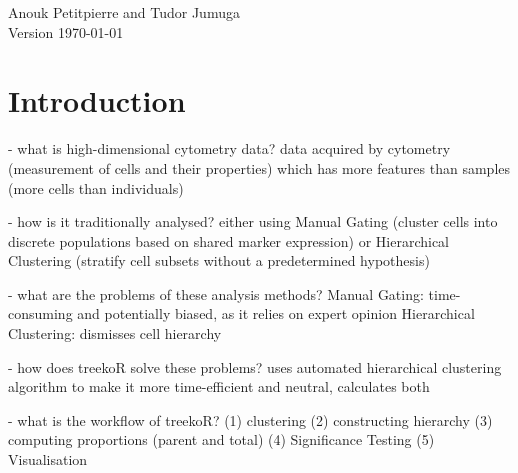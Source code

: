 \documentclass[11pt,a4paper,twoside]{report}\usepackage[]{graphicx}\usepackage[]{color}
\begin{document}
\graphicspath{{./figure/}}            %
\setcounter{tocdepth}{1}              %

\thispagestyle{empty}                 %
\begin{center}
  \vspace*{6cm}{\bfseries\Huge  %
  STA426 treekoR project\\[5mm]
  }
  \vfill

  \LARGE         Anouk Petitpierre and Tudor Jumuga\\[12mm]  %
  
  \normalsize    Version \today            %
\end{center}
\cleardoublepage

\thispagestyle{plain}
\tableofcontents
\cleardoublepage





\chapter{Introduction}

- what is high-dimensional cytometry data?
data acquired by cytometry (measurement of cells and their properties) which has more features than samples (more cells than individuals)

- how is it traditionally analysed?
either using Manual Gating (cluster cells into discrete populations based on shared marker expression) or Hierarchical Clustering (stratify cell subsets without a predetermined hypothesis)

- what are the problems of these analysis methods?
Manual Gating: time-consuming and potentially biased, as it relies on expert opinion
Hierarchical Clustering: dismisses cell hierarchy

- how does treekoR solve these problems?
uses automated hierarchical clustering algorithm to make it more time-efficient and neutral, calculates both %

- what is the workflow of treekoR?
(1) clustering
(2) constructing hierarchy
(3) computing proportions (parent and total)
(4) Significance Testing
(5) Visualisation
\end{document}
